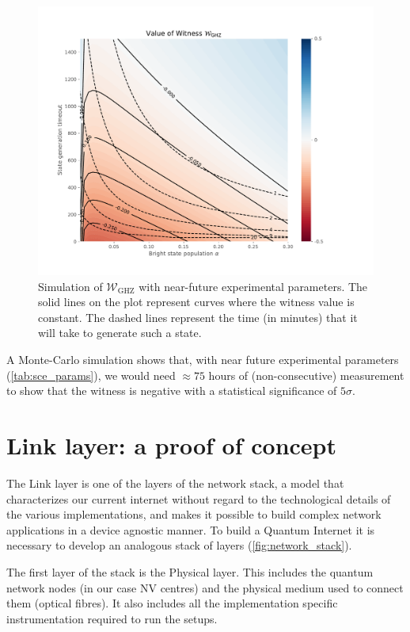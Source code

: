 \documentclass[a4paper, twoside]{article}
\begin{document}
\begin{figure}
	\includegraphics[width=\textwidth, trim=1cm 1cm 3cm 1cm 0cm]{../images/witness.pdf}
	\caption{Simulation of $\mathcal W_\text{GHZ}$ with near-future experimental parameters. The solid lines on the plot represent curves where the witness value is constant. The dashed lines represent the time (in minutes) that it will take to generate such a state.}
	\label{fig:witness}
\end{figure}

A Monte-Carlo simulation shows that, with near future experimental parameters (\autoref{tab:sce_params}), we would need $\approx 75$ hours of (non-consecutive) measurement to show that the witness is negative with a statistical significance of $5\sigma$.

\section{Link layer: a proof of concept}
\label{sec:link}

The Link layer is one of the layers of the network stack, a model that characterizes our current internet without regard to the technological details of the various implementations, and makes it possible to build complex network applications in a device agnostic manner. To build a Quantum Internet it is necessary to develop an analogous stack of layers (\autoref{fig:network_stack}). 

The first layer of the stack is the Physical layer. This includes the quantum network nodes (in our case NV centres) and the physical medium used to connect them (optical fibres). It also includes all the implementation specific instrumentation required to run the setups.
\end{document}
